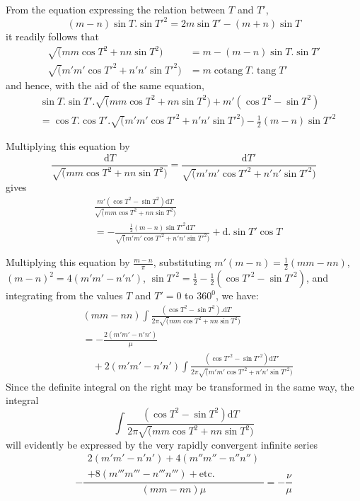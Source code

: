 From the equation expressing the relation between $T$ and $T'$,
\[
(m-n)\sin T.\sin T'^2=2m\sin T'-(m+n)\sin T
\]
it readily follows that
\[
\begin{aligned}
\surd(mm\cos T^2+nn\sin T^2)&=m-(m-n)\sin T.\sin T'\\[6pt]
\surd(m'm'\cos T'^2+n'n'\sin T'^2)&=m\mathop{\mathrm{cotang}}T.\mathop{\mathrm{tang}}T'
\end{aligned}
\]
and hence, with the aid of the same equation,
\[
\begin{aligned}
&\sin T.\sin T'.\surd(mm\cos T^2+nn\sin T^2)+m'(\cos T^2-\sin T^2)\\[6pt]
&=\cos T.\cos T'.\surd(m'm'\cos T'^2+n'n'\sin T'^2)-\tfrac12(m-n)\sin T'^2
\end{aligned}
\]
\par Multiplying this equation by
\[
\frac{\mathrm{d}T}{\surd(mm\cos T^2+nn\sin T^2)}
=\frac{\mathrm{d}T'}{\surd(m'm'\cos T'^2+n'n'\sin T'^2)}
\]
gives
\[
\begin{aligned}&\frac{m'(\cos T^2-\sin T^2)\mathrm{d}T}{\surd(mm\cos T^2+nn\sin T^2)}\\[7pt]&=-\frac{\tfrac12(m-n)\sin T'^2\mathrm{d}T'}{\surd(m'm'\cos T'^2+n'n'\sin T'^2)}+\mathrm{d}.\sin T'\cos T\end{aligned}
\]
\par Multiplying this equation by $\frac{m-n}{\pi}$, substituting
$m'(m-n)=\tfrac12(mm-nn)$,
$(m-n)^2=4(m'm'-n'n')$,
$\sin T'^2=\tfrac12-\tfrac12(\cos T'^2-\sin T'^2)$, and integrating from the values $T$ and $T'=0$ to $360^{0}$, we have:
\[
\begin{aligned}
&(mm-nn)\int\frac{(\cos T^2-\sin T^2).\mathrm{d}T}{2\pi\surd(mm\cos T^2+nn\sin T^2)}\\[6pt]
&=-\frac{2(m'm'-n'n')}{\mu}\\[7pt]&\quad+2(m'm'-n'n')\int\frac{(\cos T'^2-\sin T'^2)\mathrm{d}T'}{2\pi\surd(m'm'\cos T'^2+n'n'\sin T'^2)}
\end{aligned}
\]
Since the definite integral on the right may be transformed in the same way, the integral
\[
\int\frac{(\cos T^2-\sin T^2)\mathrm{d}T}{2\pi\surd(mm\cos T^2+nn\sin T^2)}
\]
will evidently be expressed by the very rapidly convergent infinite series
\[
-\frac{\begin{gathered}2(m'm'-n'n')+4(m''m''-n''n'')\\+8(m'''m'''-n'''n''')+\mathrm{etc.}\end{gathered}}{(mm-nn)\mu}
=-\frac{\nu}{\mu}
\]
